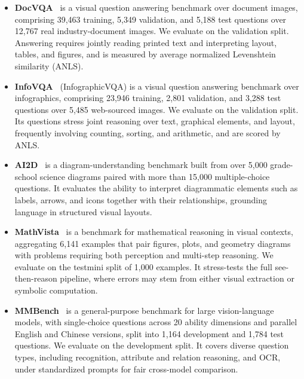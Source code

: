 \begin{itemize}[
  leftmargin=1.0em,
  labelsep=0.5em
]
    \item \textbf{DocVQA}~\cite{docvqa} is a visual question answering benchmark over document images, comprising 39,463 training, 5,349 validation, and 5,188 test questions over 12,767 real industry-document images. We evaluate on the validation split. Answering requires jointly reading printed text and interpreting layout, tables, and figures, and is measured by average normalized Levenshtein similarity (ANLS).

    \item \textbf{InfoVQA}~\cite{infovqa} (InfographicVQA) is a visual question answering benchmark over infographics, comprising 23,946 training, 2,801 validation, and 3,288 test questions over 5,485 web-sourced images. We evaluate on the validation split. Its questions stress joint reasoning over text, graphical elements, and layout, frequently involving counting, sorting, and arithmetic, and are scored by ANLS.

    \item \textbf{AI2D}~\cite{kembhavi2016diagram} is a diagram-understanding benchmark built from over 5,000 grade-school science diagrams paired with more than 15,000 multiple-choice questions. It evaluates the ability to interpret diagrammatic elements such as labels, arrows, and icons together with their relationships, grounding language in structured visual layouts.

    \item \textbf{MathVista}~\cite{lu2023mathvista} is a benchmark for mathematical reasoning in visual contexts, aggregating 6,141 examples that pair figures, plots, and geometry diagrams with problems requiring both perception and multi-step reasoning. We evaluate on the testmini split of 1,000 examples. It stress-tests the full see-then-reason pipeline, where errors may stem from either visual extraction or symbolic computation.

    \item \textbf{MMBench}~\cite{liu2024mmbench} is a general-purpose benchmark for large vision-language models, with single-choice questions across 20 ability dimensions and parallel English and Chinese versions, split into 1,164 development and 1,784 test questions. We evaluate on the development split. It covers diverse question types, including recognition, attribute and relation reasoning, and OCR, under standardized prompts for fair cross-model comparison.


\end{itemize}
